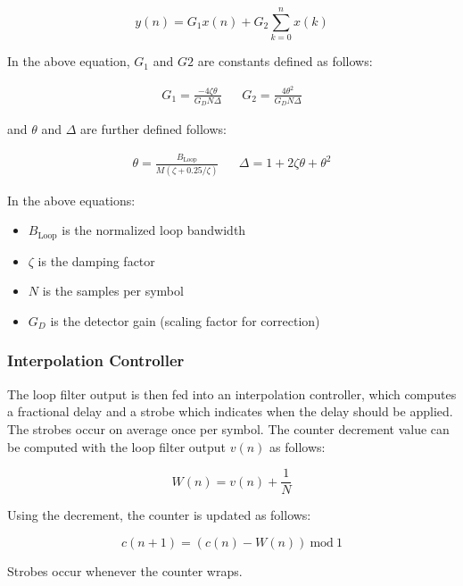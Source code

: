 \documentclass{article}
\begin{document}
\begin{equation}
	y(n) = G_1x(n) + G_2\sum_{k=0}^{n}{x(k)}
\end{equation}

\noindent In the above equation, $G_1$ and $G2$ are constants defined as follows:

\begin{align}
	G_1 = \frac{-4\zeta\theta}{G_DN\Delta} && G_2 = \frac{4\theta^2}{G_DN\Delta}
\end{align}

\noindent and $\theta$ and $\Delta$ are further defined follows:

\begin{align}
	\theta = \frac{B_{\text{Loop}}}{M(\zeta + 0.25/\zeta)} && \Delta = 1 + 2\zeta\theta + \theta^2
\end{align}

\noindent In the above equations:

\begin{itemize}
	\item $B_{\text{Loop}}$ is the normalized loop bandwidth
	\item $\zeta$ is the damping factor
	\item $N$ is the samples per symbol
	\item $G_D$ is the detector gain (scaling factor for correction)
\end{itemize}

\subsubsection{Interpolation Controller}

The loop filter output is then fed into an interpolation controller, which computes a fractional delay and a strobe which indicates when the delay should be applied. The strobes occur on average once per symbol. The counter decrement value can be computed with the loop filter output $v(n)$ as follows:

\begin{equation}
	W(n) = v(n) + \frac{1}{N}
\end{equation}

\noindent Using the decrement, the counter is updated as follows:

\begin{equation}
	c(n + 1) = (c(n) - W(n))\ \text{mod}\ 1
\end{equation}

\noindent Strobes occur whenever the counter wraps.
\end{document}
